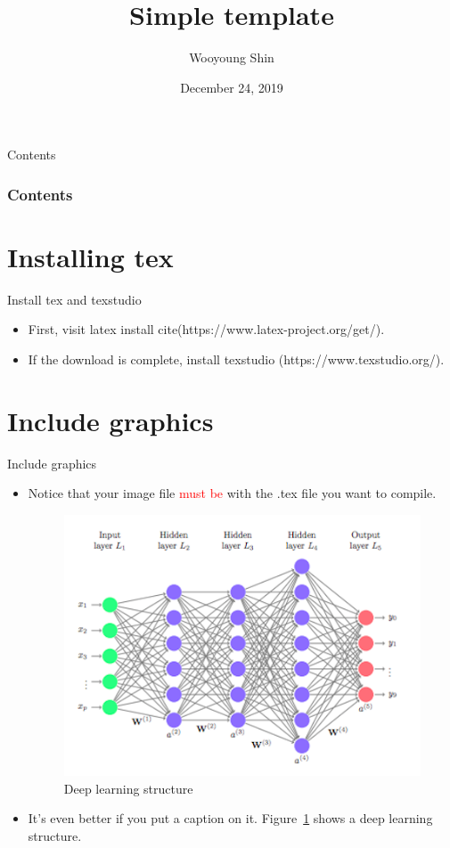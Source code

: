 \documentclass{beamer}
\title[Short title]{Simple template} %
\author{Wooyoung Shin} %
\institute[] %
{
	Dept. of Statistics, KU%
\medskip
}
\date{December 24, 2019} %
\begin{document}
\begin{frame}
\titlepage %
\end{frame}

\begin{frame}{Contents}
\frametitle{Contents}
\tableofcontents 
\end{frame}



\section{Installing tex}
\begin{frame}{Install tex and texstudio}
\begin{itemize}
        \item First, visit latex install cite(https://www.latex-project.org/get/).
        \item If the download is complete, install texstudio (https://www.texstudio.org/).
    \end{itemize}
\end{frame}

\section{Include graphics}
\begin{frame}{Include graphics}
\begin{itemize}
	\item Notice that your image file \textcolor{red}{must be} with the .tex file you want to compile.
	\begin{figure}[h]
		\centering
		\includegraphics[scale=0.4]{deep_learning.png}
		\caption{Deep learning structure}
		\label{fig:fig0}
	\end{figure}
	\item It's even better if you put a caption on it. Figure~\ref{fig:fig0} shows a deep learning structure.
\end{itemize}
\end{frame}
\end{document}
